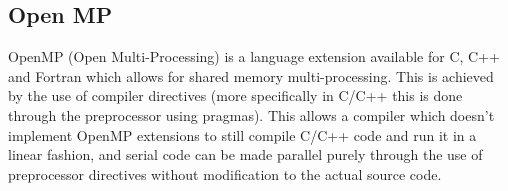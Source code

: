 \subsection{Open MP}

OpenMP (Open Multi-Processing) is a language extension available for C, C++ and Fortran which allows for shared memory multi-processing. 
This is achieved by the use of compiler directives (more specifically in C/C++ this is done through the preprocessor using pragmas). 
This allows a compiler which doesn't implement OpenMP extensions to still compile C/C++ code
and run it in a linear fashion, and serial code can be made parallel purely through the use of preprocessor
directives without modification to the actual source code.  
